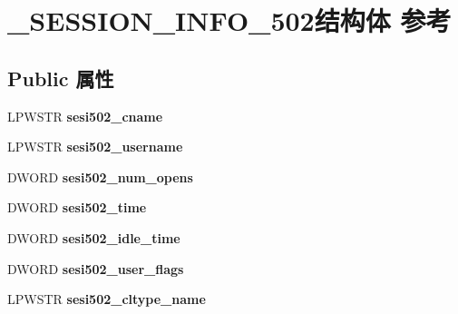 \hypertarget{struct___s_e_s_s_i_o_n___i_n_f_o__502}{}\section{\+\_\+\+S\+E\+S\+S\+I\+O\+N\+\_\+\+I\+N\+F\+O\+\_\+502结构体 参考}
\label{struct___s_e_s_s_i_o_n___i_n_f_o__502}
\subsection*{Public 属性}
\begin{DoxyCompactItemize}
\item 
\mbox{\label{struct___s_e_s_s_i_o_n___i_n_f_o__502_a814121107c834548ebb88d3ef04606e9}} 
L\+P\+W\+S\+TR {\bfseries sesi502\+\_\+cname}
\item 
\mbox{\label{struct___s_e_s_s_i_o_n___i_n_f_o__502_ab21a6093120fe5bac3396274b0183bdd}} 
L\+P\+W\+S\+TR {\bfseries sesi502\+\_\+username}
\item 
\mbox{\label{struct___s_e_s_s_i_o_n___i_n_f_o__502_ad9825828576066455e70670a64423246}} 
D\+W\+O\+RD {\bfseries sesi502\+\_\+num\+\_\+opens}
\item 
\mbox{\label{struct___s_e_s_s_i_o_n___i_n_f_o__502_ab1c8cf616a96caabe6620940cecda576}} 
D\+W\+O\+RD {\bfseries sesi502\+\_\+time}
\item 
\mbox{\label{struct___s_e_s_s_i_o_n___i_n_f_o__502_a4d47e554dc451c5f39d0685e3678e9f0}} 
D\+W\+O\+RD {\bfseries sesi502\+\_\+idle\+\_\+time}
\item 
\mbox{\label{struct___s_e_s_s_i_o_n___i_n_f_o__502_a8843fbf97cfe9b38dc8ca5941b52e408}} 
D\+W\+O\+RD {\bfseries sesi502\+\_\+user\+\_\+flags}
\item 
\mbox{\label{struct___s_e_s_s_i_o_n___i_n_f_o__502_a7728fd8a60ad0a45027b9ab831444574}} 
L\+P\+W\+S\+TR {\bfseries sesi502\+\_\+cltype\+\_\+name}
\item 

\end{DoxyCompactItemize}

